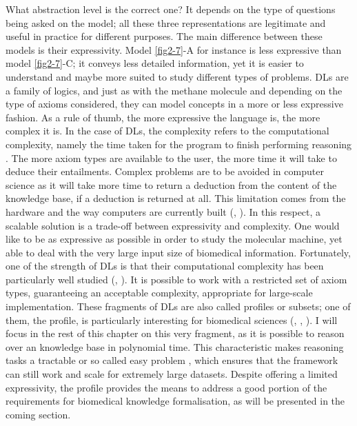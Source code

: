 What abstraction level is the correct one? It depends on the type of questions being asked on the model; all these three representations are legitimate and useful in practice for different purposes. The main difference between these models is their expressivity. Model \ref{fig2-7}-A for instance is less expressive than model \ref{fig2-7}-C; it conveys less detailed information, yet it is easier to understand and maybe more suited to study different types of problems. DLs are a family of logics, and just as with the methane molecule and depending on the type of axioms considered, they can model concepts in a more or less expressive fashion. As a rule of thumb, the more expressive the language is, the more complex it is. In the case of DLs, the complexity refers to the computational complexity, namely the time taken for the program to finish performing reasoning \citep{krotzsch2012owl}. The more axiom types are available to the user, the more time it will take to deduce their entailments. Complex problems are to be avoided in computer science as it will take more time to return a deduction from the content of the knowledge base, if a deduction is returned at all. This limitation comes from the hardware and the way computers are currently built (\cite{turing1950computing}, \cite{neumann1966theory}). In this respect, a scalable solution is a trade-off between expressivity and complexity. One would like to be as expressive as possible in order to study the molecular machine, yet able to deal with the very large input size of biomedical information. Fortunately, one of the strength of DLs is that their computational complexity has been particularly well studied (\cite{computationalprop}, \cite{ter2005completeness}). It is possible to work with a restricted set of axiom types, guaranteeing an acceptable complexity, appropriate for large-scale implementation. These fragments of DLs are also called profiles or subsets; one of them, the  profile, is particularly interesting for biomedical sciences (\cite{baader2005pushing}, \cite{baader2008pushing}, \cite{hoehndorf2011common}). I will focus in the rest of this chapter on this very fragment, as it is possible to reason over an  knowledge base in polynomial time. This characteristic makes reasoning tasks a tractable or so called easy problem \citep{cobham1965intrinsic}, which ensures that the framework can still work and scale for extremely large datasets. Despite offering a limited expressivity, the  profile provides the means to address a good portion of the requirements for biomedical knowledge formalisation, as will be presented in the coming section.

